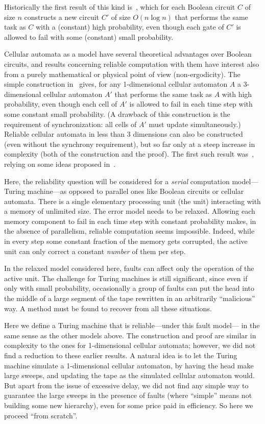 \documentclass[11pt]{memoir}
\theoremstyle{definition} %
\begin{document}
Historically the first result of this kind is~\cite{VonNeum56}, which for each Boolean
circuit \( C \) of size \( n \) constructs a new circuit \( C' \)
of size \( O(n\log n) \) that performs the same task as \( C \) with a (constant)
high probability, even though each gate of
\( C' \) is allowed to fail with some (constant) small probability.

Cellular automata as a model have several theoretical advantages over Boolean circuits, and results concerning
reliable computation with them have interest also from a purely mathematical or 
physical point of view (non-ergodicity).
The simple construction in~\cite{GacsReif3dim88} gives, for any 1-dimensional
cellular automaton \( A \) a 3-dimensional cellular automaton \( A' \) 
that performs the same task as \( A \) with high probability, even though each cell of
\( A' \) is allowed to fail in each time step with some constant small probability.
(A drawback of this construction is the requirement of synchronization: all cells of \( A' \) must
update simultaneously.)
Reliable cellular automata in less than 3 dimensions can also be constructed (even
without the synchrony requirement), but so far only at a
steep increase in complexity (both of the construction and the proof).
The first such result was~\cite{Gacs1dim86}, relying on some ideas proposed in~\cite{Kurd78}.

Here, the reliability question will be considered for a \emph{serial}
computation model---Turing machine---as opposed to parallel ones like
Boolean circuits or cellular automata.
There is a single elementary processing unit (the  unit)
interacting with a memory of unlimited size.
The error model needs to be relaxed.
Allowing each memory component to fail in each time step with constant probability
makes, in the absence of parallelism, reliable computation seems impossible.
Indeed, while in every step some constant fraction of the memory gets corrupted,
the active unit can only correct a constant \emph{number} of them per step.

In the relaxed model considered here, faults can affect only the operation of the active unit.
The challenge for Turing machines
is still significant, since even if only with small probability, occasionally a group
of faults can put the head into the middle of a large segment of the tape rewritten
in an arbitrarily ``malicious'' way.
A method must be found to recover from all these situations.

Here we define a Turing machine that is reliable---under this fault model--- in
the same sense as the other models above.
The construction and proof are similar in complexity to the ones for 1-di\-men\-sion\-al cellular automata;
however, we did not find a reduction to these earlier results.
A natural idea is to let the Turing machine simulate a 1-dimensional cellular automaton, by
having the head make large sweeps, and updating the tape as the simulated cellular automaton would.
But apart from the issue of excessive delay, we did not find any simple
way to guarantee the large sweeps in the presence of faults (where ``simple'' means not building some new
hierarchy), even for some price paid in efficiency.
So here we proceed ``from scratch''.
\end{document}

